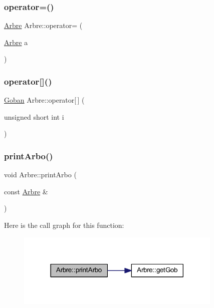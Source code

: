 \subsubsection{\texorpdfstring{operator=()}{operator=()}}
{\footnotesize\ttfamily \hyperlink{class_arbre}{Arbre} Arbre\+::operator= (\begin{DoxyParamCaption}\item[{\hyperlink{class_arbre}{Arbre}}]{a }\end{DoxyParamCaption})}

\mbox{\label{class_arbre_a8127785309368d2f2cd5a68f913e18cd}} 
\subsubsection{\texorpdfstring{operator[]()}{operator[]()}}
{\footnotesize\ttfamily \hyperlink{class_goban}{Goban} Arbre\+::operator\mbox{[}$\,$\mbox{]} (\begin{DoxyParamCaption}\item[{unsigned short int}]{i }\end{DoxyParamCaption})}

\mbox{\label{class_arbre_ac6329911b0037ca669e6ef2e12a178c9}} 
\subsubsection{\texorpdfstring{print\+Arbo()}{printArbo()}}
{\footnotesize\ttfamily void Arbre\+::print\+Arbo (\begin{DoxyParamCaption}\item[{const \hyperlink{class_arbre}{Arbre} \&}]{ }\end{DoxyParamCaption})}

Here is the call graph for this function\+:\nopagebreak
\begin{figure}[H]
\begin{center}
\leavevmode
\includegraphics[width=278pt]{class_arbre_ac6329911b0037ca669e6ef2e12a178c9_cgraph}
\end{center}
\end{figure}
\mbox{\label{class_arbre_ad7db2ec4bca90d9523c9dab19eadd628}} 
